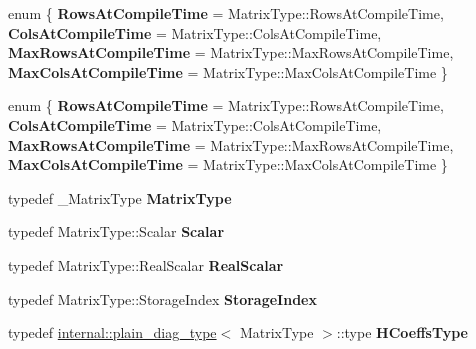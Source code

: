 \begin{DoxyCompactItemize}
\item 
\mbox{\label{group___q_r___module_a1594d9d3e0182e614a36bccc9f439b5f}} 
enum \{ {\bfseries Rows\+At\+Compile\+Time} = Matrix\+Type\+:\+:Rows\+At\+Compile\+Time, 
{\bfseries Cols\+At\+Compile\+Time} = Matrix\+Type\+:\+:Cols\+At\+Compile\+Time, 
{\bfseries Max\+Rows\+At\+Compile\+Time} = Matrix\+Type\+:\+:Max\+Rows\+At\+Compile\+Time, 
{\bfseries Max\+Cols\+At\+Compile\+Time} = Matrix\+Type\+:\+:Max\+Cols\+At\+Compile\+Time
 \}
\item 
\mbox{\label{group___q_r___module_a63e69edbe4b6cf3135d407ee1ae334ec}} 
enum \{ {\bfseries Rows\+At\+Compile\+Time} = Matrix\+Type\+:\+:Rows\+At\+Compile\+Time, 
{\bfseries Cols\+At\+Compile\+Time} = Matrix\+Type\+:\+:Cols\+At\+Compile\+Time, 
{\bfseries Max\+Rows\+At\+Compile\+Time} = Matrix\+Type\+:\+:Max\+Rows\+At\+Compile\+Time, 
{\bfseries Max\+Cols\+At\+Compile\+Time} = Matrix\+Type\+:\+:Max\+Cols\+At\+Compile\+Time
 \}
\item 
\mbox{\label{group___q_r___module_a8eba7b5263a0241cb477b3531f5ef609}} 
typedef \+\_\+\+Matrix\+Type {\bfseries Matrix\+Type}
\item 
\mbox{\label{group___q_r___module_a1aa69ca9c8caf074891ed9177a754361}} 
typedef Matrix\+Type\+::\+Scalar {\bfseries Scalar}
\item 
\mbox{\label{group___q_r___module_aa9ac87cdab6bf619ca5802cca93ca4e1}} 
typedef Matrix\+Type\+::\+Real\+Scalar {\bfseries Real\+Scalar}
\item 
\mbox{\label{group___q_r___module_af255cba487b5513259359d5e27a68d73}} 
typedef Matrix\+Type\+::\+Storage\+Index {\bfseries Storage\+Index}
\item 
\mbox{\label{group___q_r___module_aca5b63fffae26e0e1eaa38d63b575038}} 
typedef \hyperlink{struct_eigen_1_1internal_1_1plain__diag__type}{internal\+::plain\+\_\+diag\+\_\+type}$<$ Matrix\+Type $>$\+::type {\bfseries H\+Coeffs\+Type}
\item 
\mbox{\label{group___q_r___module_ae60d0d820677d67b73258322bcae0a2d}} 

\end{DoxyCompactItemize}
